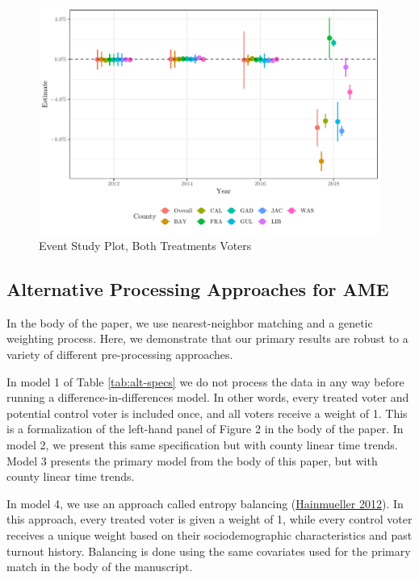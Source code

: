 \documentclass[
  12pt,
]{article}
\begin{document}
\begin{figure}[H]

{\centering \includegraphics{si_files/figure-latex/es1-1} 

}

\caption{\label{fig:es-1}Event Study Plot, Both Treatments Voters}\label{fig:es1}
\end{figure}

\hypertarget{alternative-processing-approaches-for-ame}{%
\subsection*{Alternative Processing Approaches for AME}\label{alternative-processing-approaches-for-ame}}

In the body of the paper, we use nearest-neighbor matching and a genetic weighting process. Here, we demonstrate that our primary results are robust to a variety of different pre-processing approaches.

In model 1 of Table \ref{tab:alt-specs} we do not process the data in any way before running a difference-in-differences model. In other words, every treated voter and potential control voter is included once, and all voters receive a weight of 1. This is a formalization of the left-hand panel of Figure 2 in the body of the paper. In model 2, we present this same specification but with county linear time trends. Model 3 presents the primary model from the body of this paper, but with county linear time trends.

In model 4, we use an approach called entropy balancing (\protect\hyperlink{ref-Hainmueller2012}{Hainmueller 2012}). In this approach, every treated voter is given a weight of 1, while every control voter receives a unique weight based on their sociodemographic characteristics and past turnout history. Balancing is done using the same covariates used for the primary match in the body of the manuscript.
\end{document}
